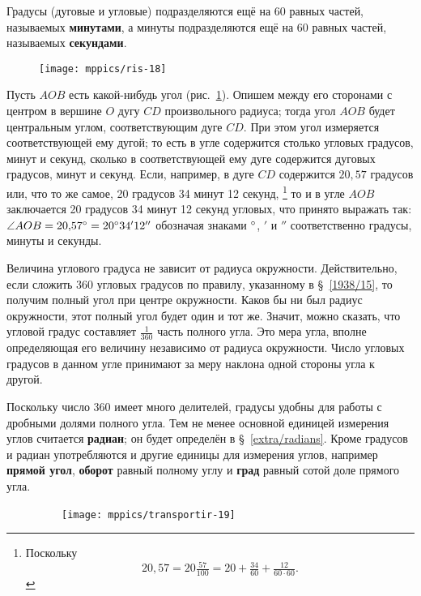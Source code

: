 Градусы (дуговые и угловые) подразделяются ещё на 60 равных частей, называемых \textbf{минутами}, а минуты подразделяются ещё на 60 равных частей, называемых \textbf{секундами}.

\begin{figure}[h!]
\centering
\texttt{[image: mppics/ris-18]}
\caption{}\label{1938/ris-18}
\end{figure}

Пусть $AOB$ есть какой-нибудь угол (рис.~\ref{1938/ris-18}).
Опишем между его сторонами с центром в вершине $O$ дугу $CD$ произвольного радиуса;
тогда угол $AOB$ будет центральным углом, соответствующим дуге $CD$.
При этом угол измеряется соответствующей ему дугой; то есть в угле содержится столько угловых градусов, минут и секунд, сколько в соответствующей ему дуге содержится дуговых градусов, минут и секунд.
Если, например, в дуге $CD$ содержится $20{,}57$ градусов или, что то же самое, 20 градусов 34 минут 12 секунд,%
\footnote{Поскольку \[20{,}57=20\tfrac{57}{100}=20+\tfrac{34}{60}+\tfrac{12}{60\cdot 60}.\]}
 то и в угле $AOB$ заключается 20 градусов 34 минут 12 секунд угловых, что принято выражать так:
$\angle AOB = 20{,}57\degree = 20\degree 34'12''$ обозначая знаками $\degree$, $'$ и $''$ соответственно градусы, минуты и секунды.

Величина углового градуса не зависит от радиуса окружности.
Действительно, если сложить 360 угловых градусов по правилу, указанному в §~\ref{1938/15}, то получим полный угол при центре окружности.
Каков бы ни был радиус окружности, этот полный угол будет один и тот же.
Значит, можно сказать, что угловой градус составляет $\tfrac1{360}$ часть полного угла.
Это мера угла, вполне определяющая его величину независимо от радиуса окружности.
Число угловых градусов в данном угле принимают за меру наклона одной стороны угла к другой.

Поскольку число 360 имеет много делителей,
градусы удобны для работы с дробными долями полного угла.
Тем не менее основной единицей измерения углов считается \textbf{радиан};
он будет определён в §~\ref{extra/radians}. 
Кроме градусов и радиан употребляются и другие единицы для измерения углов, например \textbf{прямой угол}, \textbf{оборот} равный полному углу и
\textbf{град} равный сотой доле прямого угла.

\begin{figure}[h!]
\centering
\ \ \ \ \texttt{[image: mppics/transportir-19]}
\caption{}\label{1938/ris-19}
\end{figure}

